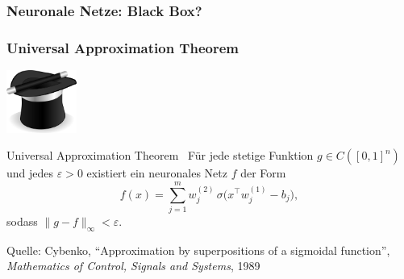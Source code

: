 \begingroup
\frametitle{ Neuronale Netze: Black Box?}
\begin{frame}[plain]
	\centering
	
	
	\vspace{1.5em}
	
\end{frame}
\endgroup

\begingroup
\frametitle{Universal Approximation Theorem}
\begin{frame}
	\vspace{-1.3em}
	\begin{minipage}[t]{0.3\linewidth}
		\centering
		\vspace{0.5em}
		\includegraphics[width=2.3cm]{BilderPräsentation/magic_hat.png}\\[0.5em]
	\end{minipage}%
	\hfill
	\begin{minipage}[t]{0.7\linewidth}
		\begin{block}{Universal Approximation Theorem~\cite{cybenko:hal-03753170}}
			\small
			Für jede stetige Funktion \( g \in C([0,1]^n) \) und jedes \( \varepsilon > 0 \)
			existiert ein neuronales Netz \( f \) der Form
			\[
			f(x) = \sum_{j=1}^{m} w^{(2)}_j\, \sigma\big( x^\top w^{(1)}_j - b_j \big),
			\]
			sodass \( \|g - f\|_\infty < \varepsilon \).
		\end{block}
	\end{minipage}
	

	{\tiny Quelle: Cybenko, “Approximation by superpositions of a sigmoidal function”, \textit{Mathematics of Control, Signals and Systems}, 1989~\cite{cybenko:hal-03753170}}
	
\end{frame}
\endgroup




